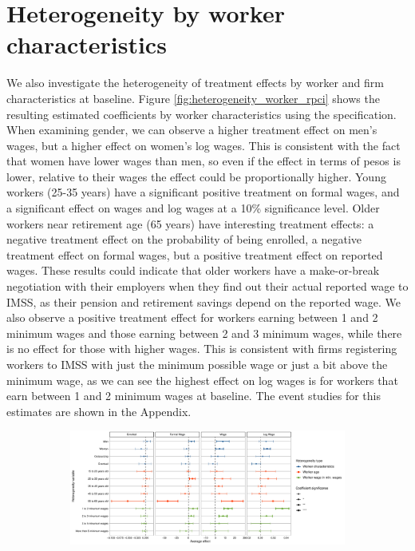 \documentclass[10pt, oneside]{book}
\begin{document}
\normalsize

\section{Heterogeneity by worker characteristics}

We also investigate the heterogeneity of treatment effects by worker and firm characteristics at baseline. Figure \ref{fig:heterogeneity_worker_rpci} shows the resulting estimated coefficients by worker characteristics using the \cite{de2020two} specification. When examining gender, we can observe a higher treatment effect on men's wages, but a higher effect on women's log wages. This is consistent with the fact that women have lower wages than men, so even if the effect in terms of pesos is lower, relative to their wages the effect could be proportionally higher. Young workers (25-35 years) have a significant positive treatment on formal wages, and a significant effect on wages and log wages at a 10\% significance level. Older workers near retirement age (65 years) have interesting treatment effects: a negative treatment effect on the probability of being enrolled, a negative treatment effect on formal wages, but a positive treatment effect on reported wages. These results could indicate that older workers have a make-or-break negotiation with their employers when they find out their actual reported wage to IMSS, as their pension and retirement savings depend on the reported wage. We also observe a positive treatment effect for workers earning between 1 and 2 minimum wages and those earning between 2 and 3 minimum wages, while there is no effect for those with higher wages. This is consistent with firms registering workers to IMSS with just the minimum possible wage or just a bit above the minimum wage, as we can see the highest effect on log wages is for workers that earn between 1 and 2 minimum wages at baseline. The event studies for this estimates are shown in the Appendix. \\

\begin{figure}[H]
    \centering
    \caption{Heterogeneity by worker characteristics \label{fig:heterogeneity_worker_rpci}}
    
    \begin{subfigure}{\textwidth}
    \includegraphics[width=\textwidth]{04_Figures/muestra_10porciento/dcdh_heterogeneity_worker_characteristics.pdf}
    \end{subfigure}
    
\end{figure}
\end{document}
